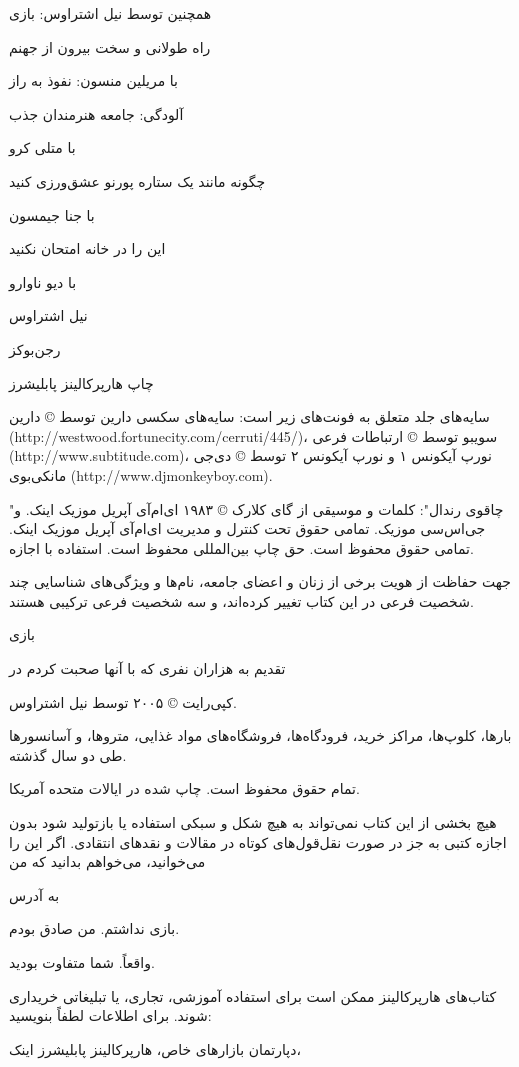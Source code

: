 همچنین توسط نیل اشتراوس: بازی

راه طولانی و سخت بیرون از جهنم

با مریلین منسون: نفوذ به راز

آلودگی: جامعه هنرمندان جذب

با متلی کرو

چگونه مانند یک ستاره پورنو عشق‌ورزی کنید

با جنا جیمسون

این را در خانه امتحان نکنید

با دیو ناوارو

نیل اشتراوس

رجن‌بوکز

چاپ هارپر‌کالینز پابلیشرز

سایه‌های جلد متعلق به فونت‌های زیر است: سایه‌های سکسی دارین توسط © دارین (http://westwood.fortunecity.com/cerruti/445/)، سویبو توسط © ارتباطات فرعی (http://www.subtitude.com)، نورپ آیکونس ۱ و نورپ آیکونس ۲ توسط © دی‌جی مانکی‌بوی (http://www.djmonkeyboy.com).

"چاقوی رندال": کلمات و موسیقی از گای کلارک © ۱۹۸۳ ای‌ام‌آی آپریل موزیک اینک. و جی‌اس‌سی موزیک. تمامی حقوق تحت کنترل و مدیریت ای‌ام‌آی آپریل موزیک اینک. تمامی حقوق محفوظ است. حق چاپ بین‌المللی محفوظ است. استفاده با اجازه.

جهت حفاظت از هویت برخی از زنان و اعضای جامعه، نام‌ها و ویژگی‌های شناسایی چند شخصیت فرعی در این کتاب تغییر کرده‌اند، و سه شخصیت فرعی ترکیبی هستند.

بازی

تقدیم به هزاران نفری که با آنها صحبت کردم در

کپی‌رایت © ۲۰۰۵ توسط نیل اشتراوس.

بارها، کلوپ‌ها، مراکز خرید، فرودگاه‌ها، فروشگاه‌های مواد غذایی، متروها، و آسانسورها طی دو سال گذشته.

تمام حقوق محفوظ است. چاپ شده در ایالات متحده آمریکا.

هیچ بخشی از این کتاب نمی‌تواند به هیچ شکل و سبکی استفاده یا بازتولید شود بدون اجازه کتبی به جز در صورت نقل‌قول‌های کوتاه در مقالات و نقدهای انتقادی. اگر این را می‌خوانید، می‌خواهم بدانید که من

به آدرس

بازی نداشتم. من صادق بودم.

واقعاً. شما متفاوت بودید.

کتاب‌های هارپر‌کالینز ممکن است برای استفاده آموزشی، تجاری، یا تبلیغاتی خریداری شوند. برای اطلاعات لطفاً بنویسید:

دپارتمان بازارهای خاص، هارپر‌کالینز پابلیشرز اینک،

